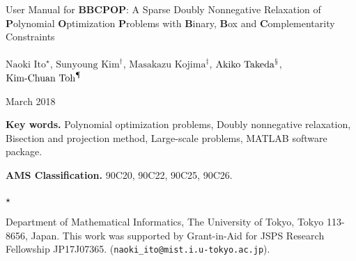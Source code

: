 \documentclass[12pt]{article}
\def\matBP{BBCPOP}
\begin{document}
\thispagestyle{empty}

\noindent
\parbox[t]{16.5cm}
{ 
User Manual for {\bf \matBP}:  
A Sparse Doubly Nonnegative Relaxation
of {\bf P}olynomial {\bf O}ptimization {\bf P}roblems
with {\bf B}inary, {\bf B}ox and {\bf C}omplementarity Constraints
 \\~\\
$\mbox{Naoki Ito}^{\star}$,
$\mbox{Sunyoung Kim}^{\dagger}$,
$\mbox{Masakazu Kojima}^{\ddagger}$, 
$\mbox{Akiko Takeda}^{\mathsection}$, 
$\mbox{Kim-Chuan Toh}^{\mathparagraph}$ \\
 \begin{center}
March 2018
\end{center}
} 

\vspace{1cm}


\begin{abstract}  
\noindent
\matBP\ proposed in \cite{ITO2018} is a MATLAB implementation of a hierarchy of sparse doubly nonnegative (DNN) relaxations 
of a class of polynomial optimization (minimization) problems (POPs) with binary, box and complementarity constraints. 
Given a POP in the class and a relaxation order (or a hierarchy level), 
\matBP\ constructs a simple conic optimization problem (COP), 
which serves as a DNN relaxation of the POP, and then solves the COP by 
applying the bisection and projection (BP) method \cite{KIM2013,KIM2016}.
The software package {\bf \matBP}, this manual, and
a  test set of POPs are available at https://sites.google.com/site/bbcpop1/.
\end{abstract}


  
\noindent
{\bf Key words. } %
Polynomial optimization problems,  Doubly nonnegative relaxation,
Bisection and projection method, Large-scale problems,
MATLAB software package.

\noindent
{\bf AMS Classification. } 
90C20,  	%
90C22,  	%
90C25, 	%
90C26.  	%


\vspace{1cm}


\noindent
\parbox[t]{0.5cm}{$\star$}
\parbox[t]{14.9cm}{Department of Mathematical Informatics,
        			The University of Tokyo, Tokyo 113-8656, Japan. 
        			This work was supported by Grant-in-Aid for JSPS Research Fellowship JP17J07365.
			({\tt naoki\_ito{@}mist.i.u-tokyo.ac.jp}).
}
\end{document}
